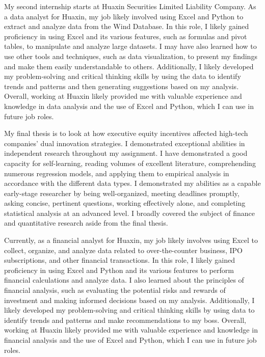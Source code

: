\documentclass[a4paper,english]{article}
\begin{document}
My second internship starts at Huaxin Securities Limited Liability Company. As a data analyst for Huaxin, my job likely involved using Excel and Python to extract and analyze data from the Wind Database. In this role, I likely gained proficiency in using Excel and its various features, such as formulas and pivot tables, to manipulate and analyze large datasets. I may have also learned how to use other tools and techniques, such as data visualization, to present my findings and make them easily understandable to others. Additionally, I likely developed my problem-solving and critical thinking skills by using the data to identify trends and patterns and then generating suggestions based on my analysis. Overall, working at Huaxin likely provided me with valuable experience and knowledge in data analysis and the use of Excel and Python, which I can use in future job roles.

My final thesis is to look at how executive equity incentives affected high-tech companies' dual innovation strategies. I demonstrated exceptional abilities in independent research throughout my assignment. I have demonstrated a good capacity for self-learning, reading volumes of excellent literature, comprehending numerous regression models, and applying them to empirical analysis in accordance with the different data types. I demonstrated my abilities as a capable early-stage researcher by being well-organized, meeting deadlines promptly, asking concise, pertinent questions, working effectively alone, and completing statistical analysis at an advanced level. I broadly covered the subject of finance and quantitative research aside from the final thesis.

Currently, as a financial analyst for Huaxin, my job likely involves using Excel to collect, organize, and analyze data related to over-the-counter business, IPO subscriptions, and other financial transactions. In this role, I likely gained proficiency in using Excel and Python and its various features to perform financial calculations and analyze data. I also learned about the principles of financial analysis, such as evaluating the potential risks and rewards of investment and making informed decisions based on my analysis. Additionally, I likely developed my problem-solving and critical thinking skills by using data to identify trends and patterns and make recommendations to my boss. Overall, working at Huaxin likely provided me with valuable experience and knowledge in financial analysis and the use of Excel and Python, which I can use in future job roles.
\end{document}
